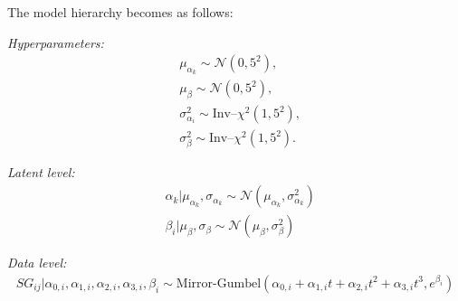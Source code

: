 \documentclass{article}\usepackage[]{graphicx}\usepackage[]{color}
\newcommand{\N}{\mathcal{N}}
\begin{document}
The model hierarchy becomes as follows:
\medskip\par 
\emph{Hyperparameters:}
\begin{align*}
     &\mu_{\alpha_k} \sim \N(0,5^2), \\
    &\mu_\beta \sim \N(0,5^2), \\
    &\sigma^2_{\alpha_i} \sim \text{Inv–}\chi^2(1, 5^2), \\
    &\sigma_\beta^2 \sim \text{Inv–}\chi^2(1, 5^2).
\end{align*}
\smallskip\par 
\emph{Latent level:}
\begin{align*}
    &\alpha_k|\mu_{\alpha_k}, \sigma_{\alpha_k} \sim \N(\mu_{\alpha_k}, \sigma_{\alpha_k}^2) \\
    &\beta_i|\mu_\beta, \sigma_\beta \sim \N(\mu_\beta,\sigma_\beta^2)
\end{align*}
\smallskip\par 
\emph{Data level:}
\begin{align*}
    SG_{ij}|\alpha_{0,i},\alpha_{1,i},\alpha_{2,i},\alpha_{3,i}, \beta_i \sim \text{Mirror-Gumbel}(\alpha_{0,i} + \alpha_{1,i}t + \alpha_{2,i}t^2 + \alpha_{3,i}t^3, e^{\beta_i})
\end{align*}
\end{document}
